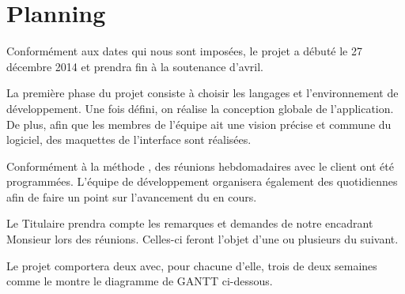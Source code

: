\chapter{Planning}
Conformément aux dates qui nous sont imposées, le projet a débuté le 27 décembre 2014 et prendra fin à la soutenance d'avril.

La première phase du projet consiste à choisir les langages et l'environnement de développement. Une fois défini, on réalise la conception globale de l'application. De plus, afin que les membres de l'équipe ait une vision précise et commune du logiciel, des maquettes de l'interface sont réalisées.  

Conformément à la méthode , des réunions hebdomadaires avec le client ont été programmées. L'équipe de développement organisera également des  quotidiennes afin de faire un point sur l'avancement du  en cours. 

Le Titulaire prendra compte les remarques et demandes de notre encadrant Monsieur  lors des réunions. Celles-ci feront l'objet d'une ou plusieurs  du  suivant. 

Le projet comportera deux  avec, pour chacune d'elle, trois  de deux semaines comme le montre le diagramme de GANTT ci-dessous.

